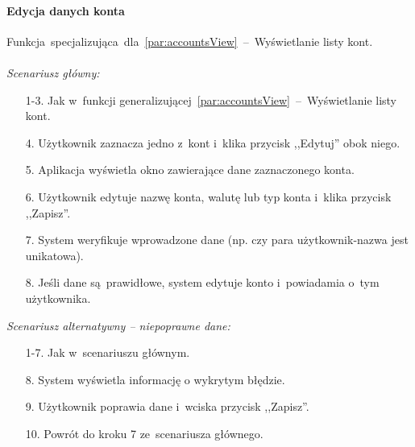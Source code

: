 \paragraph{Edycja danych konta\newline}
\label{par:accountEdit}
Funkcja~specjalizująca~dla~\ref{par:accountsView}~--~Wyświetlanie listy kont.\\\\
\textit{Scenariusz główny:}
\begin{enumerate}
  \item[1-3.] Jak w~funkcji generalizującej~\ref{par:accountsView}~--~Wyświetlanie listy kont.
  \item[4.] Użytkownik zaznacza jedno z~kont i~klika przycisk ,,Edytuj'' obok niego.
  \item[5.] Aplikacja wyświetla okno zawierające dane zaznaczonego konta.
  \item[6.] Użytkownik edytuje nazwę konta, walutę lub typ konta i~klika przycisk ,,Zapisz''.
  \item[7.] System weryfikuje wprowadzone dane (np. czy para użytkownik-nazwa jest unikatowa).
  \item[8.] Jeśli dane są~prawidłowe, system edytuje konto i~powiadamia o~tym użytkownika.
\end{enumerate}
\textit{Scenariusz alternatywny -- niepoprawne dane:}
\begin{enumerate}
  \item[1-7.] Jak w~scenariuszu głównym.
  \item[8.] System wyświetla informację o wykrytym błędzie.
  \item[9.] Użytkownik poprawia dane i~wciska przycisk ,,Zapisz''.
  \item[10.] Powrót do kroku 7 ze~scenariusza głównego.
\end{enumerate}

